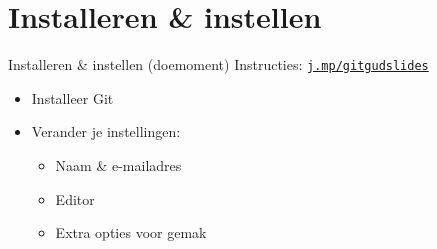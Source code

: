 \section[Get git]{Installeren \& instellen}

\begin{frame}{Installeren \& instellen (doemoment)}
	Instructies: \href{https://j.mp/gitgudslides}{\texttt{j.mp/gitgudslides}}
	\begin{itemize}
		\item Installeer Git
		\item Verander je instellingen:
			\begin{itemize}
				\item Naam \& e-mailadres
				\item Editor
				\item Extra opties voor gemak
			\end{itemize}
	\end{itemize}
\end{frame}
